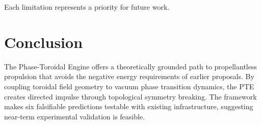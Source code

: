 \documentclass[preprint,12pt]{elsarticle}
\begin{document}
Each limitation represents a priority for future work.

\section{Conclusion}
\label{sec:conclusion}

The Phase-Toroidal Engine offers a theoretically grounded path to propellantless propulsion that avoids the negative energy requirements of earlier proposals. By coupling toroidal field geometry to vacuum phase transition dynamics, the PTE creates directed impulse through topological symmetry breaking. The framework makes six falsifiable predictions testable with existing infrastructure, suggesting near-term experimental validation is feasible.
\end{document}

